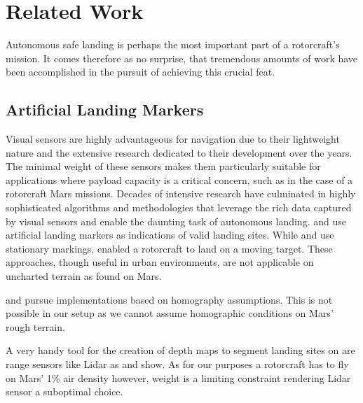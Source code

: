 \chapter{Related Work}
\label{sec:relwork}

Autonomous safe landing is perhaps the most important part of a rotorcraft's mission. It comes therefore as no surprise, that tremendous amounts of work have been accomplished in the pursuit of achieving this crucial feat. 

\section{Artificial Landing Markers}

Visual sensors are highly advantageous for navigation due to their lightweight nature and the extensive research dedicated to their development over the years. The minimal weight of these sensors makes them particularly suitable for applications where payload capacity is a critical concern, such as in the case of a rotorcraft Mars missions. Decades of intensive research have culminated in highly sophisticated algorithms and methodologies that leverage the rich data captured by visual sensors and enable the daunting task of autonomous landing. \citep{Saripalli2002VisionBasedLanding,Falanga2017QuadrotorLanding} and \citep{Mu2023VisionBasedLanding} use artificial landing markers as indications of valid landing sites. While \citep{Saripalli2002VisionBasedLanding} and \citep{Mu2023VisionBasedLanding} use stationary markings, \citep{Falanga2017QuadrotorLanding} enabled a rotorcraft to land on a moving target. These approaches,  though useful in urban environments,  are not applicable on uncharted terrain as found on Mars.

\citep{Bosch2006AutonomousDetection,Brockers2011AutonomousLanding,Desaraju2015VisionBased} and \citep{Brockers2014TowardsAutonomous} pursue implementations based on homography assumptions. This is not possible in our setup as we cannot assume homographic conditions on Mars' rough terrain. %

A very handy tool for the creation of depth maps to segment landing sites on are range sensors like Lidar as \citep{Trawny2015FlightTesting, Luna2017Evaluation, Johnson2002LidarBased} and \citep{Scherer2012AutonomousLanding} show. As for our purposes a rotorcraft has to fly on Mars' 1\% air density however, weight is a limiting constraint rendering Lidar sensor a suboptimal choice.

